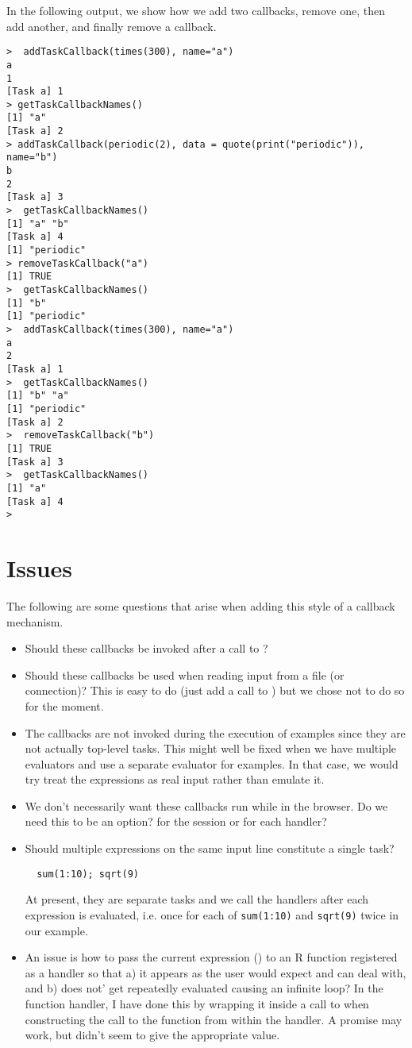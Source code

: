 \documentclass{article}
\begin{document}
In the following output, we show how we add two callbacks, remove one,
then add another, and finally remove a callback.
\begin{verbatim}
>  addTaskCallback(times(300), name="a")
a 
1 
[Task a] 1
> getTaskCallbackNames()
[1] "a"
[Task a] 2
> addTaskCallback(periodic(2), data = quote(print("periodic")), name="b")
b 
2 
[Task a] 3
>  getTaskCallbackNames()
[1] "a" "b"
[Task a] 4
[1] "periodic"
> removeTaskCallback("a")
[1] TRUE
>  getTaskCallbackNames()
[1] "b"
[1] "periodic"
>  addTaskCallback(times(300), name="a")
a 
2 
[Task a] 1
>  getTaskCallbackNames()
[1] "b" "a"
[1] "periodic"
[Task a] 2
>  removeTaskCallback("b")
[1] TRUE
[Task a] 3
>  getTaskCallbackNames()
[1] "a"
[Task a] 4
> 
\end{verbatim}


\section{Issues}

The following are some questions that arise when adding this style of
a callback mechanism.

\begin{itemize}
\item Should these callbacks be invoked after a call
to ?


\item Should these callbacks be used when reading input from a file
  (or connection)?  This is easy to do (just add a call to
  ) but we chose not to do so for the moment.

\item The callbacks are not invoked during the execution of examples
  since they are not actually top-level tasks.  This might well be
  fixed when we have multiple evaluators and use a separate evaluator
  for examples.  In that case, we would try treat the expressions as
  real input rather than emulate it.

\item We don't necessarily want these callbacks run while in the
  browser. Do we need this to be an option?  for the session or for
  each handler?
\item Should multiple expressions on the same input line
 constitute a single task? 
\begin{verbatim}
  sum(1:10); sqrt(9)
\end{verbatim}
 At present, they are separate tasks and we call the handlers after
 each expression is evaluated, i.e. once for each of \verb+sum(1:10)+
 and \verb+sqrt(9)+ twice in our example.

\item
An issue is how to pass the current expression () to
an R function registered as a handler so that a) it appears as the
user would expect and can deal with, and b) does not' get repeatedly
evaluated causing an infinite loop?  In the function handler, I have
done this by wrapping it inside a call to  when
constructing the call to the function from within the handler.
A promise may work, but didn't seem to give the appropriate value.

\end{itemize}
\end{document}
